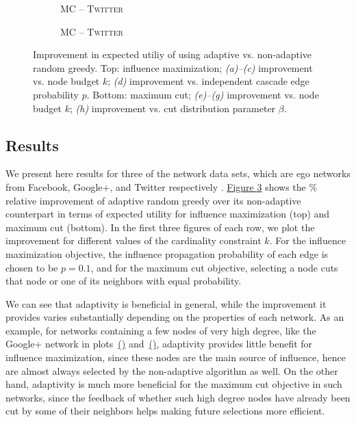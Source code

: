 \documentclass{article}
\newcommand{\figref}[1]{\hyperref[#1]{Figure \ref*{#1}}}
\newcommand{\subcapref}[1]{\hyperref[#1]{\mbox{(\subref*{#1})}}}
\newcommand{\twitter}{\textsc{Twitter}\xspace}
\newcommand{\maxcut}{MC\xspace}
\begin{document}
\begin{figure}[tb]
\begin{subfigure}[b]{\subflen}
    \caption{\hspace{\scspacex}\maxcut{} -- \twitter}
    \label{fig:mc_twitter}
  \end{subfigure}
  \begin{subfigure}[b]{\subflen}
    
    \vspace{\scspacey}
    \caption{\hspace{\scspacex}\maxcut{} -- \twitter}
    \label{fig:pmc_twitter}
  \end{subfigure}
  \caption{
    Improvement in expected utiliy of using adaptive vs. non-adaptive random greedy.
    Top: influence maximization; \emph{(a)--(c)} improvement vs. node budget $k$; \emph{(d)} improvement vs. independent cascade edge probability $p$.
    Bottom: maximum cut; \emph{(e)--(g)} improvement vs. node budget $k$; \emph{(h)} improvement vs. cut distribution parameter $\beta$.
  }
  \label{fig:exp}
\end{figure}

\subsection{Results}
We present here results for three of the network data sets, which are ego networks from Facebook, Google+, and Twitter respectively \cite{mcauley12}.
\figref{fig:exp} shows the $\%$ relative improvement of adaptive random greedy over its non-adaptive counterpart in terms of expected utility for influence maximization (top) and maximum cut (bottom).
In the first three figures of each row, we plot the improvement for different values of the cardinality constraint $k$.
For the influence maximization objective, the influence propagation probability of each edge is chosen to be $p=0.1$, and for the maximum cut objective, selecting a node cuts that node or one of its neighbors with equal probability.

We can see that adaptivity is beneficial in general, while the improvement it provides varies substantially depending on the properties of each network.
As an example, for networks containing a few nodes of very high degree, like the Google+ network in plots~\subcapref{fig:inf_gplus} and~\subcapref{fig:mc_gplus}, adaptivity provides little benefit for influence maximization, since these nodes are the main source of influence, hence are almost always selected by the non-adaptive algorithm as well.
On the other hand, adaptivity is much more beneficial for the maximum cut objective in such networks, since the feedback of whether such high degree nodes have already been cut by some of their neighbors helps making future selections more efficient.
\end{document}
